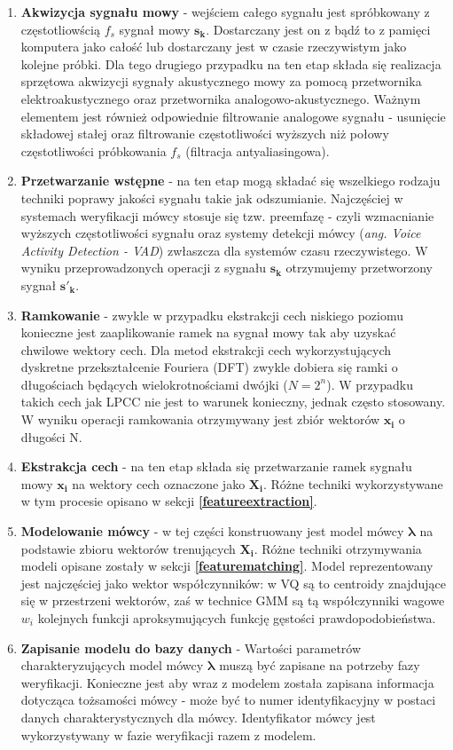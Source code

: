 \begin{enumerate}
\item{\textbf{Akwizycja sygnału mowy}} - wejściem całego sygnału jest spróbkowany z częstotliowścią $f_s$ sygnał mowy $\bm{s_k}$. Dostarczany jest on z bądź to z pamięci komputera jako całość lub dostarczany jest w czasie rzeczywistym jako kolejne próbki. Dla tego drugiego przypadku na ten etap składa się realizacja sprzętowa akwizycji sygnały akustycznego mowy za pomocą przetwornika elektroakustycznego oraz przetwornika analogowo-akustycznego. Ważnym elementem jest również odpowiednie filtrowanie analogowe sygnału - usunięcie składowej stałej oraz filtrowanie częstotliwości wyższych niż połowy częstotliwości próbkowania $f_s$ (filtracja antyaliasingowa).
\item{\textbf{Przetwarzanie wstępne}} - na ten etap mogą składać się wszelkiego rodzaju techniki poprawy jakości sygnału takie jak odszumianie. Najczęściej w systemach weryfikacji mówcy stosuje się tzw. preemfazę - czyli wzmacnianie wyższych częstotliwości sygnału oraz systemy detekcji mówcy (\textit{ang. Voice Activity Detection - VAD})  zwłaszcza dla systemów czasu rzeczywistego. W wyniku przeprowadzonych operacji z sygnału $\bm{s_k}$ otrzymujemy przetworzony sygnał $\bm{s'_k}$.
\item{\textbf{Ramkowanie}} - zwykle w przypadku ekstrakcji cech niskiego poziomu konieczne jest zaaplikowanie ramek na sygnał mowy tak aby uzyskać chwilowe wektory cech. Dla metod ekstrakcji cech wykorzystujących dyskretne przekształcenie Fouriera (DFT) zwykle dobiera się ramki o długościach będących wielokrotnościami dwójki ($N=2^n$). W przypadku takich cech jak LPCC nie jest to warunek konieczny, jednak często stosowany. W wyniku operacji ramkowania otrzymywany jest zbiór wektorów $\bm{x_i}$ o długości N.
\item{\textbf{Ekstrakcja cech}} - na ten etap składa się przetwarzanie ramek sygnału mowy $\bm{x_i}$ na wektory cech oznaczone jako $\bm{X_i}$. Różne techniki wykorzystywane w tym procesie opisano w sekcji \textbf{\ref{featureextraction}}.
\item{\textbf{Modelowanie mówcy}} - w tej części konstruowany jest model mówcy $\bm{\lambda}$ na podstawie zbioru wektorów trenujących $\bm{X_i}$. Różne techniki otrzymywania modeli opisane zostały w sekcji \textbf{\ref{featurematching}}. Model reprezentowany jest najczęściej jako wektor współczynników: w VQ są to centroidy znajdujące się w przestrzeni wektorów, zaś w technice GMM są tą współczynniki wagowe $w_i$ kolejnych funkcji aproksymujących funkcję gęstości prawdopodobieństwa.
\item{\textbf{Zapisanie modelu do bazy danych}} - Wartości parametrów charakteryzujących model mówcy $\bm{\lambda}$ muszą być zapisane na potrzeby fazy weryfikacji. Konieczne jest aby wraz z modelem została zapisana informacja dotycząca tożsamości mówcy - może być to numer identyfikacyjny w postaci danych charakterystycznych dla mówcy. Identyfikator mówcy jest wykorzystywany w fazie weryfikacji razem z modelem.
\end{enumerate}

